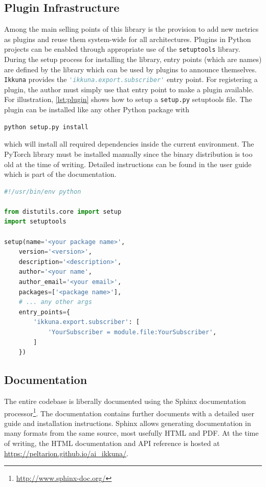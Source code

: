 \hypertarget{plugin-infrastructure}{%
\subsection{Plugin Infrastructure}\label{plugin-infrastructure}}

Among the main selling points of this library is the provision to add new
metrics as plugins and reuse them system-wide for all architectures. Plugins in
Python projects can be enabled through appropriate use of the
\texttt{setuptools} library. During the setup process for installing the
library, entry points (which are names) are defined by the library which can be
used by plugins to announce themselves. \verb+Ikkuna+ provides the
\lstinline[language=Python,breaklines=false]{'ikkuna.export.subscriber'} entry
point. For registering a plugin, the author must simply use that entry point to
make a plugin available. For illustration, \cref{lst:plugin} shows how to setup
a \texttt{setup.py} setuptools file. The plugin can be installed like any other
Python package with
\begin{lstlisting}[language=Python]
python setup.py install
\end{lstlisting}
which will install all required dependencies inside the current
environment. The PyTorch library must be installed manually since the binary
distribution is too old at the time of writing. Detailed instructions can be
found in the user guide which is part of the documentation.

\begin{lstlisting}[label=lst:plugin, language=Python, caption=Sample setup script for subscriber plugins]
#!/usr/bin/env python

from distutils.core import setup
import setuptools

setup(name='<your package name>',
    version='<version>',
    description='<description>',
    author='<your name',
    author_email='<your email>',
    packages=['<package name>'],
    # ... any other args
    entry_points={
        'ikkuna.export.subscriber': [
            'YourSubscriber = module.file:YourSubscriber',
        ]
    })
\end{lstlisting}

\subsection{Documentation}\label{doc}

The entire codebase is liberally documented using the Sphinx documentation
processor\footnote{\url{http://www.sphinx-doc.org/}}. The documentation contains
further documents with a detailed user guide and installation instructions. Sphinx
allows generating documentation in many formats from the same source, most
usefully HTML and PDF. At the time of writing, the HTML documentation and API
reference is hosted at \url{https://peltarion.github.io/ai_ikkuna/}.

